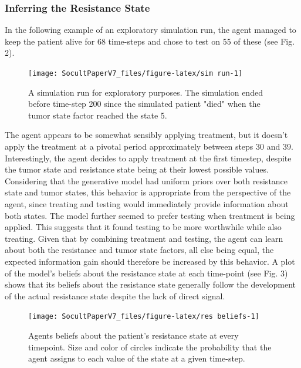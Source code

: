 \documentclass[
]{article}
\begin{document}
\subsubsection{Inferring the Resistance
State}\label{inferring-the-resistance-state}

In the following example of an exploratory simulation run, the agent
managed to keep the patient alive for 68 time-steps and chose to test on
55 of these (see Fig. 2).

\begin{figure}

{\centering \texttt{[image: SocultPaperV7\_files/figure-latex/sim run-1]} 

}

\caption{A simulation run for exploratory purposes. The simulation ended before time-step 200 since the simulated patient "died" when the tumor state factor reached the state 5.}\label{fig:sim run}
\end{figure}

The agent appears to be somewhat sensibly applying treatment, but it
doesn't apply the treatment at a pivotal period approximately between
steps 30 and 39. Interestingly, the agent decides to apply treatment at
the first timestep, despite the tumor state and resistance state being
at their lowest possible values. Considering that the generative model
had uniform priors over both resistance state and tumor states, this
behavior is appropriate from the perspective of the agent, since
treating and testing would immediately provide information about both
states. The model further seemed to prefer testing when treatment is
being applied. This suggests that it found testing to be more worthwhile
while also treating. Given that by combining treatment and testing, the
agent can learn about both the resistance and tumor state factors, all
else being equal, the expected information gain should therefore be
increased by this behavior. A plot of the model's beliefs about the
resistance state at each time-point (see Fig. 3) shows that its beliefs
about the resistance state generally follow the development of the
actual resistance state despite the lack of direct signal.

\begin{figure}

{\centering \texttt{[image: SocultPaperV7\_files/figure-latex/res beliefs-1]} 

}

\caption{Agents beliefs about the patient's resistance  state at every timepoint. Size and color of circles indicate the probability that the agent assigns to each value of the state at a given time-step.}\label{fig:res beliefs}
\end{figure}
\end{document}
